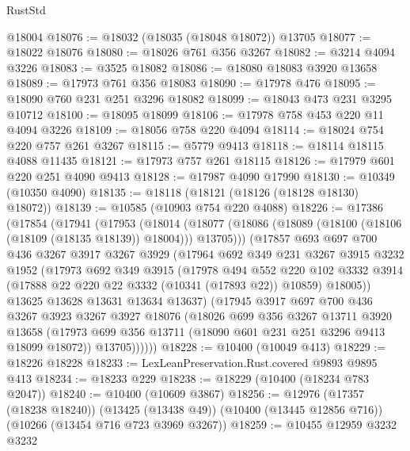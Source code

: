 \begin{lexlean}{RustStd}
\begin{coremodule}
    @18004
@18076 := @18032 (@18035 (@18048 @18072)) @13705
@18077 := @18022 @18076
@18080 := @18026 @761 @356 @3267
@18082 := @3214 @4094 @3226
@18083 := @3525 @18082
@18086 := @18080 @18083 @3920 @13658
@18089 := @17973 @761 @356 @18083
@18090 := @17978 @476
@18095 := @18090 @760 @231 @251 @3296 @18082
@18099 := @18043 @473 @231 @3295 @10712
@18100 := @18095 @18099
@18106 := @17978 @758 @453 @220 @11 @4094 @3226
@18109 := @18056 @758 @220 @4094
@18114 := @18024 @754 @220 @757 @261 @3267
@18115 := @5779 @9413
@18118 := @18114 @18115 @4088 @11435
@18121 := @17973 @757 @261 @18115
@18126 := @17979 @601 @220 @251 @4090 @9413
@18128 := @17987 @4090 @17990
@18130 := @10349 (@10350 @4090)
@18135 := @18118 (@18121 (@18126 (@18128 @18130) @18072))
@18139 := @10585 (@10903 @754 @220 @4088)
@18226 := @17386
    (@17854
      (@17941
        (@17953
          (@18014
            (@18077 (@18086 (@18089 (@18100 (@18106 (@18109 (@18135 @18139)) @18004))) @13705)))
          (@17857
            @693
            @697
            @700
            @436
            @3267
            @3917
            @3267
            @3929
            (@17964
              @692
              @349
              @231
              @3267
              @3915
              @3232
              @1952
              (@17973
                @692
                @349
                @3915
                (@17978
                  @494
                  @552
                  @220
                  @102
                  @3332
                  @3914
                  (@17888 @22 @220 @22 @3332 (@10341 (@17893 @22)) @10859)
                  @18005))
              @13625
              @13628
              @13631
              @13634
              @13637)
            (@17945
              @3917
              @697
              @700
              @436
              @3267
              @3923
              @3267
              @3927
              @18076
              (@18026
                @699
                @356
                @3267
                @13711
                @3920
                @13658
                (@17973 @699 @356 @13711 (@18090 @601 @231 @251 @3296 @9413 @18099 @18072))
                @13705))))))
@18228 := @10400 (@10049 @413)
@18229 := @18226 @18228
@18233 := LexLeanPreservation.Rust.covered @9893 @9895 @413
@18234 := @18233 @229
@18238 := @18229 (@10400 (@18234 @783 @2047))
@18240 := @10400 (@10609 @3867)
@18256 := @12976
    (@17357 (@18238 @18240))
    (@13425 (@13438 @49))
    (@10400 (@13445 @12856 @716))
    (@10266 (@13454 @716 @723 @3969 @3267))
@18259 := @10455 @12959 @3232 @3232

\end{coremodule}
\end{lexlean}
